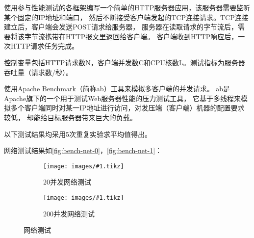 \documentclass[supercite]{HustGraduPaper}
\newcommand{\cfig}[3]{
  \begin{figure}[htb]
    \centering
    \texttt{[image: images/\#1.tikz]}
    \caption{#3}
    \label{fig:#1}
  \end{figure}
}
\newcommand{\sfig}[3]{
  \begin{subfigure}[b]{#2\textwidth}
    \texttt{[image: images/\#1.tikz]}
    \caption{#3}
    \label{fig:#1}
  \end{subfigure}
}
\newcommand{\xfig}[3]{
  \begin{figure}[htb]
    \centering
    #3
    \caption{#2}
    \label{fig:#1}
  \end{figure}
}
\newcommand{\rfig}[1]{\autoref{fig:#1}}
\theoremstyle{definition}
\begin{document}

使用参与性能测试的各框架编写一个简单的HTTP服务器应用，该服务器需要监听某个固定的IP地址和端口，
然后不断接受客户端发起的TCP连接请求。TCP连接建立后，客户端会发送POST请求给服务器，
服务器在读取请求的字节流后，需要将该字节流携带在HTTP报文里返回给客户端。
客户端收到HTTP响应后，一次HTTP请求任务完成。\par

控制变量包括HTTP请求数N，客户端并发数C和CPU核数L。测试指标为服务器吞吐量（请求数/秒）。\par

使用Apache Benchmark\cite{brunelle2013evaluating}（简称ab）工具来模拟多客户端的并发请求。
ab是Apache旗下的一个用于测试Web服务器性能的压力测试工具，
它基于多线程来模拟多个客户端同时对某一IP地址进行访问，对发压端（客户端）机器的配置要求较低，
却能给目标服务器带来巨大的负载。\par

以下测试结果均采用5次重复实验求平均值得出。\par

网络测试结果如\rfig{bench-net-0}，\rfig{bench-net-1}：\par

%

\xfig{bench-net}{网络测试}{
  \sfig{bench-net-0}{0.4}{20并发网络测试}
  \sfig{bench-net-1}{0.4}{200并发网络测试}
}

\end{document}
